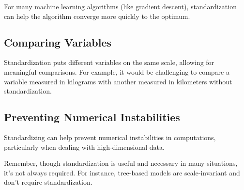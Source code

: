 For many machine learning algorithms (like gradient descent), standardization can help the algorithm converge more quickly to the optimum.

\subsection{Comparing Variables}

Standardization puts different variables on the same scale, allowing for meaningful comparisons. For example, it would be challenging to compare a variable measured in kilograms with another measured in kilometers without standardization.

\subsection{Preventing Numerical Instabilities}

Standardizing can help prevent numerical instabilities in computations, particularly when dealing with high-dimensional data.

Remember, though standardization is useful and necessary in many situations, it's not always required. For instance, tree-based models are scale-invariant and don't require standardization. 
